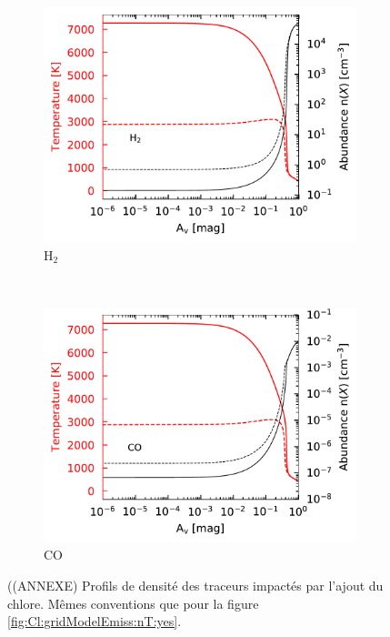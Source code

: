 \begin{appendices}
\begin{figure}[!htbp]
    \begin{subfigure}[t]{0.49\textwidth} %
        \centering \includegraphics[trim = {0 0 0 0},clip,width=1\textwidth]{figure/Cl/gridModelEmiss/nT_comp_H2.pdf}
        \caption{$\mathrm{H}_2$}
    \end{subfigure}
    ~ 
    \begin{subfigure}[t]{0.49\textwidth} %
        \centering \includegraphics[trim = {0 0 0 0},clip,width=1\textwidth]{figure/Cl/gridModelEmiss/nT_comp_CO.pdf}
        \caption{$\mathrm{CO}$}
    \end{subfigure}
    
    \caption{((ANNEXE) Profils de densité des traceurs impactés par l'ajout du chlore. Mêmes conventions que pour la figure \ref{fig:Cl:gridModelEmiss:nT:yes}.}
    \label{fig:Cl:gridModelEmiss:nT:no}
\end{figure}



\end{appendices}
